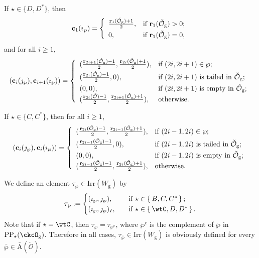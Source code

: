 \documentclass[12pt,a4paper]{amsart}
\newcommand{\CO}{{\mathcal {O}}}
\numberwithin{equation}{section}
\theoremstyle{remark}
\def\Irr{\mathrm{Irr}}
\def\Wg{W_{\mathrm g}}
\def\imathp{\imath_{\wp}}
\def\jmathp{\jmath_{\wp}}
\def\CPPs{\mathrm{PP}_{\star}}
\begin{document}
If $\star\in\{D,D^*\}$, then
 \[
   \mathbf c_{1}(\imath_\wp)= \left\{
     \begin{array}{ll}
            \frac{\mathbf r_1(\check \CO_{\mathrm g})+1}{2},   &\hbox{if $\mathbf r_1(\check \CO_{\mathrm g})>0$}; \smallskip\\
       0,  &\hbox{if $\mathbf r_1(\check \CO_{\mathrm g})=0$},\\
            \end{array}
   \right.
 \]
and for all $i\geq 1$,
\[
(\mathbf c_{i}(\jmath_\wp), \mathbf c_{i+1}(\imath_\wp))=
   \left\{
     \begin{array}{ll}
            (\frac{\mathbf r_{2i+1}(\check \CO_{\mathrm g})-1}{2},  \frac{\mathbf r_{2i}(\check \CO_{\mathrm g})+1}{2}), &\hbox{if $(2i, 2i+1)\in \wp$}; \smallskip\\
        (\frac{\mathbf r_{2i}(\check \CO_{\mathrm g})-1}{2},  0), & \hbox{if $(2i, 2i+1)$ is tailed in $\check \CO_{\mathrm g}$};\smallskip\\
         (0,  0), &\hbox{if $(2i, 2i+1)$ is empty in $\check \CO_{\mathrm g}$};\\
         (\frac{\mathbf r_{2i}(\check \CO)-1}{2},  \frac{\mathbf r_{2i+1}(\check \CO_{\mathrm g})+1}{2}), &\hbox{otherwise}.\\
            \end{array}
   \right.
\]


If $\star\in\{C,C^*\}$, then for all $i\geq 1$,
\[
(\mathbf c_{i}(\jmath_\wp), \mathbf c_{i}(\imath_\wp))=
   \left\{
     \begin{array}{ll}
            (\frac{\mathbf r_{2i}(\check \CO_{\mathrm g})-1}{2},  \frac{\mathbf r_{2i-1}(\check \CO_{\mathrm g})+1}{2}), &\hbox{if $(2i-1, 2i)\in \wp$}; \smallskip\\
        (\frac{\mathbf r_{2i-1}(\check \CO_{\mathrm g})-1}{2},  0), & \hbox{if $(2i-1, 2i)$ is tailed in $\check \CO_{\mathrm g}$};\smallskip\\
         (0,  0), &\hbox{if $(2i-1, 2i)$ is empty in $\check \CO_{\mathrm g}$};\\
         (\frac{\mathbf r_{2i-1}(\check \CO_{\mathrm g})-1}{2},  \frac{\mathbf r_{2i}(\check \CO_{\mathrm g})+1}{2}), &\hbox{otherwise}.\\
            \end{array}
   \right.
\]


We define an element $\tau_{\wp}\in \Irr(\Wg)$ by
  \begin{equation}\label{eq:tauwp}
    \tau_{\wp} :=
    \begin{cases}
      (\imathp,\jmathp),  & \quad \text{if } \star \in \set{B,C, C^{*} }; \\
      (\imathp,\jmathp)_{I},  & \quad \text{if } \star \in \set{\wtC,D,D^{*}}.
    \end{cases}
  \end{equation}
  Note that  if $\star=\wtC$, then $\tau_{\wp} = \tau_{\wp^{c}}$, where $\wp^{c}$ is the complement of $\wp$ in $\CPPs(\ckcO_{\mathrm g})$.
Therefore in all cases,   $\tau_{\bar \wp}\in \Irr(\Wg)$ is obviously defined for every $\bar \wp\in \bar{\mathrm A}(\check \CO)$.
\end{document}
